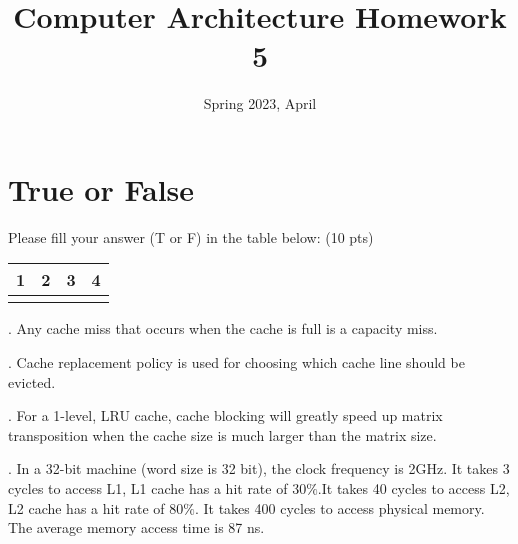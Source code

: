 \documentclass{article}
\title{Computer Architecture Homework 5}
\date{Spring 2023, April}
\begin{document}
\maketitle
\setlength{\headsep}{-30pt}
\setlength{\footskip}{100pt}
\section{True or False}
\noindent Please fill your answer (T or F) in the table below:{\color{red} (10 pts)}\par
\begin{table}[h!]
\centering
\renewcommand{\arraystretch}{1.6}
\setlength{\tabcolsep}{5mm}
\begin{tabular}{|c|c|c|c|}
\hline
1 & 2 & 3 & 4 \\ \hline
  &   &   &  \\ \hline
\end{tabular}
\end{table}
\begin{spacing}{1.2}
. Any cache miss that occurs when the cache is full is a capacity miss.\par
{}. Cache replacement policy is used for choosing which cache line should be evicted.\par
{}. For a 1-level, LRU cache, cache blocking will greatly speed up matrix transposition when the cache size is much larger than the matrix size.\par
{}. In a 32-bit machine (word size is 32 bit), the clock frequency is 2GHz. It takes 3 cycles to access L1, L1 cache has a hit rate of 30$\%$.It takes 40 cycles to access L2, L2 cache has a hit rate of 80$\%$. It takes 400 cycles to access physical memory. The average memory access time is 87{\color{red} ns}.\par
\end{spacing}
~\\
\end{document}
